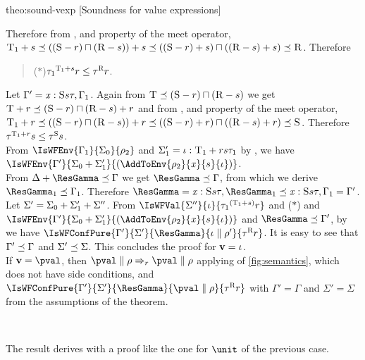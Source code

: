 \begin{proofOf}{theo:sound-vexp} [Soundness for value expressions]
\begin{description}
Therefore  from 
,  and property of
the meet operator, $\textsc{T}_1+s\preceq((\textsc{S}-r)\sqcap(\textsc{R}-s))+s\preceq((\textsc{S}-r)+s)\sqcap((\textsc{R}-s)+s)\preceq\textsc{R}$.
Therefore 
\begin{quote}
($\ast$)\quad ${\tau_1}^{\textsc{T}_1+s}{r}\leq\tau^{\textsc{R}}{r}$.
\end{quote}
Let  $\Gamma'=\mathit{x} :\textsc{S}{s}{\tau},\Gamma_1$. Again from  $\textsc{T}\preceq(\textsc{S}-r)\sqcap(\textsc{R}-s)$ we get  $\textsc{T}+r\preceq(\textsc{S}-r)\sqcap(\textsc{R}-s)+r$ and from 
,  and property of
the meet operator, $\textsc{T}_1+r\preceq((\textsc{S}-r)\sqcap(\textsc{R}-s))+r\preceq((\textsc{S}-r)+r)\sqcap((\textsc{R}-s)+r)\preceq\textsc{S}$. Therefore
 ${\tau}^{\textsc{T}_1+r}{s}\leq\tau^{\textsc{S}}{s}$. \\
From $\IsWFEnv{\Gamma_1}{\Sigma_0}{\env_2}$ and $\Sigma'_1=\iota :\textsc{T}_1+r{s}{\tau_1}$  by , we have 
 $\IsWFEnv{\Gamma'}{\Sigma_0\ctxsum\Sigma'_1}{(\AddToEnv{\env_2}{\x}{\sgr}{\loc})}$. \\
From $\Delta\ctxsum\ResGamma\ctxord\Gamma$ we get $\ResGamma\ctxord\Gamma$, from which we derive $\ResGamma_1\ctxord\Gamma_1$.
Therefore $\ResGamma=\CtxElem{\x}{\Sgr}{\sgr}{\tau},\ResGamma_1\ctxord\CtxElem{\x}{\Sgr}{\sgr}{\tau},\Gamma_1=\Gamma'$.\\
  Let $\Sigma'=\Sigma_0+\Sigma'_1+\Sigma''$. From $\IsWFVal{\Sigma''}{\loc}{\Graded{{\tau_1}}{(\Tgr_1\rsum\sgr)}{\rgr}}$ 
  and  ($\ast$) 
  and 
 $\IsWFEnv{\Gamma'}{\Sigma_0\ctxsum\Sigma'_1}{(\AddToEnv{\env_2}{\x}{\sgr}{\loc})}$ and   $\ResGamma\ctxord\Gamma'$,
by  
   we have $\IsWFConfPure{\Gamma'}{\Sigma'}{\ResGamma}{\VConf{\loc}{\env'}}{\Graded{\tau}{\Rgr}{\rgr}}$.
   It is easy to see that $\Gamma'\preceq\Gamma$ and  $\Sigma'\preceq\Sigma$.
  This concludes the proof for  $\mathbf{v}=\iota$.\\
  If $\val=\pval$, then $\RedVal{\pval}{\env}{\rgr}{\pval}{\env}$ applying   of \cref{fig:semantics}, which does not have side conditions, and  
  $\IsWFConfPure{\Gamma'}{\Sigma'}{\ResGamma}{\VConf{\pval}{\env}}{\Graded{\tau}{\Rgr}{\rgr}}$ 
  with $\Gamma'=\Gamma$ and $\Sigma'=\Sigma$ from the assumptions of the theorem.

%

  \item [Case $\ve=\pval$.]\

The result derives with a proof like the one for $\unit$ of the previous case.
\end{description}
\end{proofOf}

